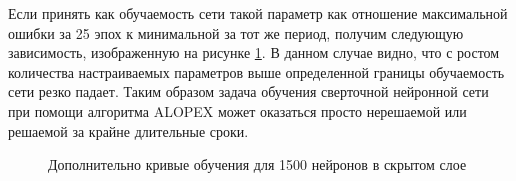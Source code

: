 \documentclass[utf8,usehyperref,14pt]{G7-32}
\begin{document}
Если принять как обучаемость сети такой параметр как отношение максимальной ошибки за 25 эпох к минимальной за тот же период, получим следующую зависимость, изображенную на рисунке \ref{ALOPEX_learnability}. В данном случае видно, что с ростом количества настраиваемых параметров выше определенной границы обучаемость сети резко падает. Таким образом задача обучения сверточной нейронной сети при помощи алгоритма ALOPEX может оказаться просто нерешаемой или решаемой за крайне длительные сроки.

\begin{figure}[H]
  \caption{Дополнительно кривые обучения для 1500 нейронов в скрытом слое}\label{ALOPEX_learnability}
\end{figure}
\end{document}

